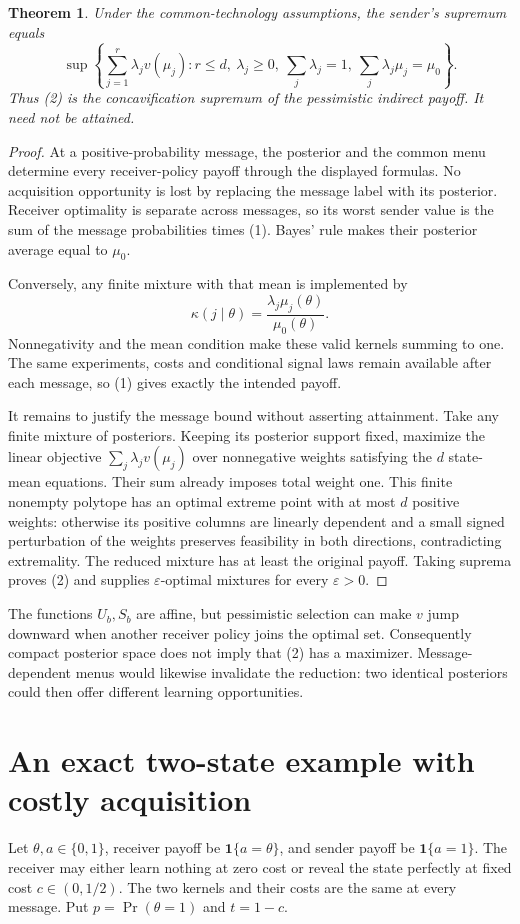 \documentclass[11pt]{article}
\newtheorem{theorem}{Theorem}
\theoremstyle{definition}
\begin{document}
\begin{theorem}
Under the common-technology assumptions, the sender's supremum equals
\[
 \sup\left\{\sum_{j=1}^r\lambda_j v(\mu_j):
 r\le d,\ \lambda_j\ge0,\ \sum_j\lambda_j=1,
 \ \sum_j\lambda_j\mu_j=\mu_0\right\}.                 \tag{2}
\]
Thus (2) is the concavification supremum of the pessimistic indirect
payoff. It need not be attained.
\end{theorem}
\begin{proof}
At a positive-probability message, the posterior and the common menu
determine every receiver-policy payoff through the displayed formulas.
No acquisition opportunity is lost by replacing the message label with
its posterior. Receiver optimality is separate across messages, so its
worst sender value is the sum of the message probabilities times (1).
Bayes' rule makes their posterior average equal to $\mu_0$.

Conversely, any finite mixture with that mean is implemented by
\[
 \kappa(j\mid\theta)=\frac{\lambda_j\mu_j(\theta)}
                               {\mu_0(\theta)}.
\]
Nonnegativity and the mean condition make these valid kernels summing
to one. The same experiments, costs and conditional signal laws remain
available after each message, so (1) gives exactly the intended payoff.

It remains to justify the message bound without asserting attainment.
Take any finite mixture of posteriors. Keeping its posterior support
fixed, maximize the linear objective $\sum_j\lambda_j v(\mu_j)$ over
nonnegative weights satisfying the $d$ state-mean equations. Their sum
already imposes total weight one. This finite nonempty polytope has an
optimal extreme point with at most $d$ positive weights: otherwise its
positive columns are linearly dependent and a small signed perturbation
of the weights preserves feasibility in both directions, contradicting
extremality. The reduced mixture has at least the original payoff.
Taking suprema proves (2) and supplies $\varepsilon$-optimal mixtures
for every $\varepsilon>0$.
\end{proof}
The functions $U_b,S_b$ are affine, but pessimistic selection can make
$v$ jump downward when another receiver policy joins the optimal set.
Consequently compact posterior space does not imply that (2) has a
maximizer. Message-dependent menus would likewise invalidate the reduction:
two identical posteriors could then offer different learning opportunities.

\section*{An exact two-state example with costly acquisition}
Let $\theta,a\in\{0,1\}$, receiver payoff be
$\mathbf1\{a=\theta\}$, and sender payoff be $\mathbf1\{a=1\}$.
The receiver may either learn nothing at zero cost or reveal the state
perfectly at fixed cost $c\in(0,1/2)$. The two kernels and their costs
are the same at every message. Put $p=\Pr(\theta=1)$ and $t=1-c$.
\end{document}

